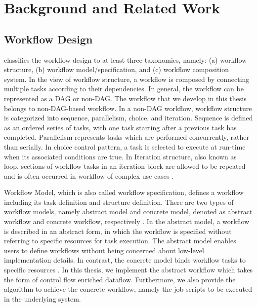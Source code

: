 \chapter{Background and Related Work} 

\section{Workflow Design}
\cite{yu2005taxonomy} classifies the workflow design to at least three taxonomies, namely: (a) workflow structure, (b) workflow model/specification, and (c) workflow composition system. In the view of workflow structure, a workflow is composed by connecting multiple tasks according to their dependencies. In general, the workflow can be represented as a DAG or non-DAG. The workflow that we develop in this thesis belongs to non-DAG-based workflow. In a non-DAG workflow, workflow structure is categorized into sequence, parallelism, choice, and iteration. Sequence is defined as an ordered series of tasks, with one task starting after a previous task has completed. Parallelism represents tasks which are performed concurrently, rather than serially. In choice control pattern, a task is selected to execute at run-time when its associated conditions are true. In Iteration structure, also known as loop, sections of workflow tasks in an iteration block are allowed to be repeated and is often occurred in workflow of complex use cases \cite{yu2005taxonomy}.  

Workflow Model, which is also called workflow specification, defines a workflow including its task definition and structure definition. There are two types of workflow models, namely abstract model and concrete model, denoted as abstract workflow and concrete workflow, respectively \cite{deelman2004workflow}. In the abstract model, a workflow is described in an abstract form, in which the workflow is specified without referring to specific resources for task execution. The abstract model enables users to define workflows without being concerned about low-level implementation details. In contrast, the concrete model binds workflow tasks to specific resources \cite{yu2005taxonomy}. In this thesis, we implement the abstract workflow which takes the form of control flow enriched dataflow. Furthermore, we also provide the algorithm to achieve the concrete workflow, namely the job scripts to be executed in the underlying system. 

